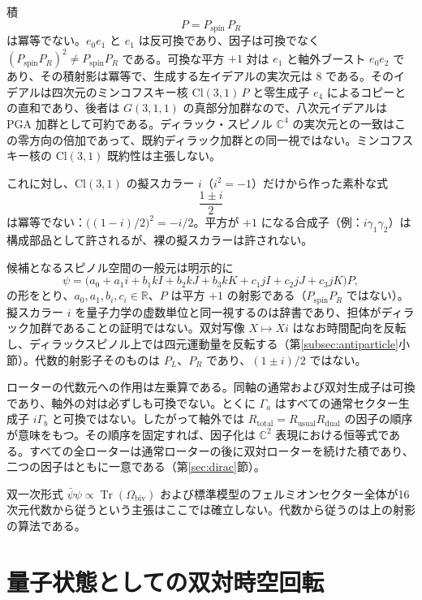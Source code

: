 \documentclass[a4paper]{article}
\begin{document}
積
\[
P = P_{\mathrm{spin}}\, P_R
\]
は冪等でない。$e_0 e_1$ と $e_1$ は反可換であり、因子は可換でなく $(P_{\mathrm{spin}}P_R)^2\neq P_{\mathrm{spin}}P_R$ である。可換な平方 $+1$ 対は $e_1$ と軸外ブースト $e_0 e_2$ であり、その積射影は冪等で、生成する左イデアルの実次元は $8$ である。そのイデアルは四次元のミンコフスキー核 $\mathrm{Cl}(3,1)\,P$ と零生成子 $e_4$ によるコピーとの直和であり、後者は $G(3,1,1)$ の真部分加群なので、八次元イデアルは PGA 加群として可約である。ディラック・スピノル $\mathbb{C}^4$ の実次元との一致はこの零方向の倍加であって、既約ディラック加群との同一視ではない。ミンコフスキー核の $\mathrm{Cl}(3,1)$ 既約性は主張しない。

これに対し、$\mathrm{Cl}(3,1)$ の擬スカラー $i$（$i^2=-1$）だけから作った素朴な式
\[
\frac{1\pm i}{2}
\]
は冪等でない：$\bigl((1-i)/2\bigr)^2=-i/2$。平方が $+1$ になる合成子（例：$i\gamma_1\gamma_2$）は構成部品として許されるが、裸の擬スカラーは許されない。

候補となるスピノル空間の一般元は明示的に
\[
\psi = \bigl( a_0 + a_1 i + b_1 kI + b_2 kJ + b_3 kK + c_1 jI + c_2 jJ + c_3 jK \bigr) P,
\]
の形をとり、$a_0,a_1,b_i,c_i \in \mathbb{R}$、$P$ は平方 $+1$ の射影である（$P_{\mathrm{spin}}P_R$ ではない）。擬スカラー $i$ を量子力学の虚数単位と同一視するのは辞書であり、担体がディラック加群であることの証明ではない。双対写像 $X \mapsto X i$ はなお時間配向を反転し、ディラックスピノル上では四元運動量を反転する（第\ref{subsec:antiparticle}小節）。代数的射影子そのものは $P_L$、$P_R$ であり、$(1\pm i)/2$ ではない。

ローターの代数元への作用は左乗算である。同軸の通常および双対生成子は可換であり、軸外の対は必ずしも可換でない。とくに $\Gamma_a$ はすべての通常セクター生成子 $i\Gamma_b$ と可換ではない。したがって軸外では $R_{\mathrm{total}}=R_{\mathrm{usual}}R_{\mathrm{dual}}$ の因子の順序が意味をもつ。その順序を固定すれば、因子化は $\mathbb{C}^2$ 表現における恒等式である。すべての全ローターは通常ローターの後に双対ローターを続けた積であり、二つの因子はともに一意である（第\ref{sec:dirac}節）。

双一次形式 $\bar{\psi}\psi\propto\operatorname{Tr}(\Omega_{\mathrm{biv}})$ および標準模型のフェルミオンセクター全体が16次元代数から従うという主張はここでは確立しない。代数から従うのは上の射影の算法である。

\section{量子状態としての双対時空回転}
\label{sec:quantumstates}
\end{document}
